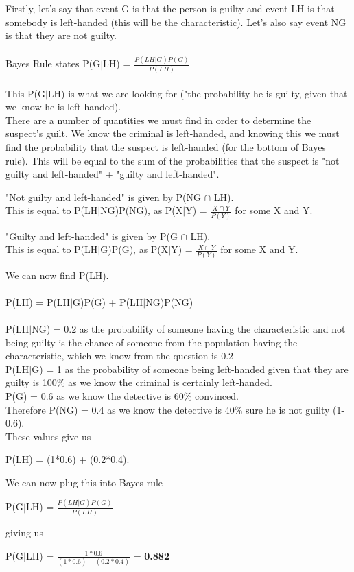 \documentclass{report}
\begin{document}
		Firstly, let's say that event G is that the person is guilty and event LH is that somebody is left-handed (this will be the characteristic). Let's also say event NG is that they are not guilty.\\\\
		Bayes Rule states P(G$\vert$LH) = $\frac{P(LH \vert G)P(G)}{P(LH)}$\\\\
		This P(G$\vert$LH) is what we are looking for ("the probability he is guilty, given that we know he is left-handed).\\
		There are a number of quantities we must find in order to determine the suspect's guilt. We know the criminal is left-handed, and knowing this we must find the probability that the suspect is left-handed (for the bottom of Bayes rule). This will be equal to the sum of the probabilities that the suspect is "not guilty and left-handed" + "guilty and left-handed".
		\begin{center}
			"Not guilty and left-handed" is given by P(NG $\cap$ LH).\\
			This is equal to P(LH$\vert$NG)P(NG), as P(X$\vert$Y) = $\frac{X \cap Y}{P(Y)}$ for some X and Y.
		\end{center}
		\begin{center}
			"Guilty and left-handed" is given by P(G $\cap$ LH).\\
			This is equal to P(LH$\vert$G)P(G), as P(X$\vert$Y) = $\frac{X \cap Y}{P(Y)}$ for some X and Y.
		\end{center}
		We can now find P(LH).\\\\
		P(LH) = P(LH$\vert$G)P(G) + P(LH$\vert$NG)P(NG)\\\\
		P(LH$\vert$NG) = 0.2 as the probability of someone having the characteristic and not being guilty is the chance of someone from the population having the characteristic, which we know from the question is 0.2\\
		P(LH$\vert$G) = 1 as the probability of someone being left-handed given that they are guilty is 100\% as we know the criminal is certainly left-handed.\\
		P(G) = 0.6 as we know the detective is 60\% convinced.\\
		Therefore P(NG) = 0.4 as we know the detective is 40\% sure he is not guilty (1-0.6).\\
		These values give us
		\begin{center}
			P(LH) = (1*0.6) + (0.2*0.4).
		\end{center}
		We can now plug this into Bayes rule
		\begin{center}
			P(G$\vert$LH) = $\frac{P(LH \vert G)P(G)}{P(LH)}$ 
		\end{center}
		giving us
		\begin{center}
			P(G$\vert$LH) = $\frac{1*0.6}{(1*0.6) + (0.2*0.4)}$ = \textbf{0.882}
		\end{center}
		
\end{document}

